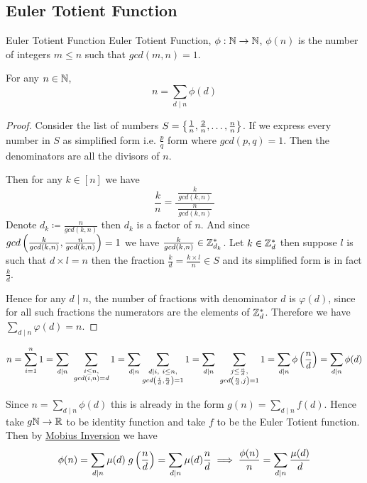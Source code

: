 \subsection{Euler Totient Function}
\begin{Definition}{Euler Totient Function}{}
	Euler Totient Function, $\phi:\mathbb{N}\to\mathbb{N}$, $\phi(n)$ is the number of integers $m\leq n$ such that $gcd(m,n)=1$.
\end{Definition}
\begin{lemma}{}{}
	For any $n\in \mathbb{N}$, $$n=\sum_{d\mid n}\phi(d)$$
\end{lemma}
\begin{proof}
		Consider the list of numbers $S=\left\{\frac1n,\frac2n,\dots,\frac{n}{n}\right\}$. If we express every number in $S$ as simplified form i.e. $\frac{p}{q}$ form where $gcd(p,q)=1$. Then the denominators are all the divisors of $n$. 
	
	
	Then for any $k\in[n]$ we have $$\frac{k}{n}=\frac{\ \frac{k}{gcd(k,n)}\ }{\ \frac{n}{gcd(k,n)}\ }$$Denote $d_k\coloneqq\frac{n}{gcd(k,n)}$ then $d_k$ is a factor of $n$. And since $gcd\left( \frac{k}{gcd(k,n)}, \frac{n}{gcd(k,n)} \right)=1$ we have $\frac{k}{gcd(k,n)}\in \mathbb{Z}_{d_k}^*$. Let $k\in\mathbb{Z}_{d}^*$ then suppose $l$ is such that $d\times l=n$ then the fraction $\frac{k}{d}=\frac{k\times l}{n}\in S$ and its simplified form is in fact $\frac{k}{d}$.
	
	Hence for any $d\mid n$, the number of fractions with denominator $d$ is $\varphi(d)$, since for all such fractions the numerators are the elements of $\mathbb{Z}_{d}^*$. Therefore we have $\sum\limits_{d\mid n} \varphi(d)=n$.
	
\end{proof}
\begin{alternate-proof}
	$$n  = \sum_{i=1}^n 1 = \sum_{d\mid n}\ \sum_{\substack{i\leq n,\\ gcd(i,n)=d}}1=\sum_{d\mid n} \sum_{\substack{d\mid i,\ i\leq n,\\ gcd\lt(\frac{i}d,\frac{n}d\rt)=1}}1=\sum_{d\mid n}\ \sum_{\substack{j\leq \frac{n}d,\\ gcd\lt(\frac{n}d,j\rt)=1}}1= \sum_{d\mid n}\phi\lt(\frac{n}d\rt)=\sum_{d\mid n}\phi(d)$$
\end{alternate-proof}

Since $n=\sum\limits_{d\mid n}\phi(d)$ this is already in the form $g(n)=\sum\limits_{d\mid n}f(d)$. Hence take $g\mathbb{N}\to \mathbb{R}$ to be identity function and take $f$ to be the Euler Totient function. Then by \hyperref[th:mi]{Mobius Inversion} we have $$\phi(n)=\sum_{d\mid n}\mu(d)\; g\left(\frac{n}d\right)=\sum_{d\mid n}\mu(d)\frac{n}d\implies \frac{\phi(n)}{n}=\sum_{d\mid n}\frac{\mu(d)}{d}$$


